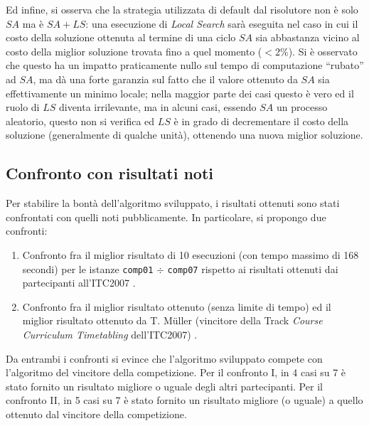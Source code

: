 \documentclass[]{article}
\newcommand{\q}[1]{``#1''}
\begin{document}
Ed infine, si osserva che la strategia utilizzata di default dal risolutore non è solo $SA$ ma è $SA+LS$: una esecuzione di \textit{Local Search} sarà eseguita nel caso in cui il costo della soluzione ottenuta al termine di una ciclo $SA$ sia abbastanza vicino al costo della miglior soluzione trovata fino a quel momento ($<2\%$). Si è osservato che questo ha un impatto praticamente nullo sul tempo di computazione \q{rubato} ad $SA$, ma dà una forte garanzia sul fatto che il valore ottenuto da $SA$ sia effettivamente un minimo locale; nella maggior parte dei casi questo è vero ed il ruolo di $LS$ diventa irrilevante, ma in alcuni casi, essendo $SA$ un processo aleatorio, questo non si verifica ed $LS$ è in grado di decrementare il costo della soluzione (generalmente di qualche unità), ottenendo una nuova miglior soluzione.

\subsection{Confronto con risultati noti}

Per stabilire la bontà dell'algoritmo sviluppato, i risultati ottenuti sono stati confrontati con quelli noti pubblicamente. In particolare, si propongo due confronti:

\begin{enumerate}[I]
	\item Confronto fra il miglior risultato di 10 esecuzioni (con tempo massimo di 168 secondi) per le istanze \texttt{comp01} $\div$ \texttt{comp07} rispetto ai risultati ottenuti dai partecipanti all'ITC2007 \cite{bib:itc2007-finalists}.
	\item Confronto fra il miglior risultato ottenuto (senza limite di tempo) ed il miglior risultato ottenuto da T. Müller (vincitore della Track \textit{Course Curriculum Timetabling} dell'ITC2007)  \cite{bib:muller}.
\end{enumerate}


Da entrambi i confronti si evince che l'algoritmo sviluppato compete con l'algoritmo del vincitore della competizione. Per il confronto I, in 4 casi su 7 è stato fornito un risultato migliore o uguale degli altri partecipanti. Per il confronto II, in 5 casi su 7 è stato fornito un risultato migliore (o uguale) a quello ottenuto dal vincitore della competizione.
\end{document}
